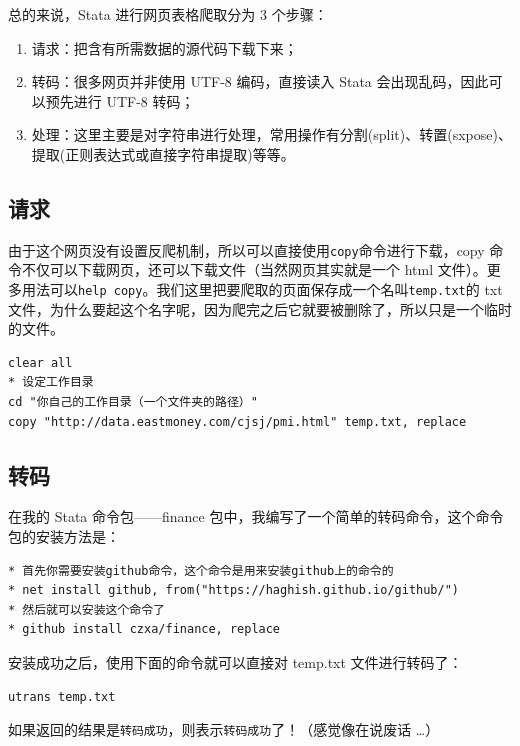 \documentclass[cn,fancy,blue,11pt]{elegantbook}
\begin{document}
总的来说，Stata 进行网页表格爬取分为 3 个步骤：
\begin{enumerate}
  \item 请求：把含有所需数据的源代码下载下来；
  \item 转码：很多网页并非使用 UTF-8 编码，直接读入 Stata 会出现乱码，因此可以预先进行 UTF-8 转码；
  \item 处理：这里主要是对字符串进行处理，常用操作有分割(split)、转置(sxpose)、提取(正则表达式或直接字符串提取)等等。
\end{enumerate}

\hypertarget{section-32}{%
\subsection{请求}\label{section-32}}

由于这个网页没有设置反爬机制，所以可以直接使用\lstinline{copy}命令进行下载，copy 命令不仅可以下载网页，还可以下载文件（当然网页其实就是一个 html 文件）。更多用法可以\lstinline{help copy}。我们这里把要爬取的页面保存成一个名叫\lstinline{temp.txt}的 txt 文件，为什么要起这个名字呢，因为爬完之后它就要被删除了，所以只是一个临时的文件。

\begin{lstlisting}
clear all
* 设定工作目录
cd "你自己的工作目录（一个文件夹的路径）"
copy "http://data.eastmoney.com/cjsj/pmi.html" temp.txt, replace
\end{lstlisting}

\hypertarget{section-33}{%
\subsection{转码}\label{section-33}}

在我的 Stata 命令包------finance 包中，我编写了一个简单的转码命令，这个命令包的安装方法是：

\begin{lstlisting}
* 首先你需要安装github命令，这个命令是用来安装github上的命令的
* net install github, from("https://haghish.github.io/github/")
* 然后就可以安装这个命令了
* github install czxa/finance, replace
\end{lstlisting}

安装成功之后，使用下面的命令就可以直接对 temp.txt 文件进行转码了：

\begin{lstlisting}
utrans temp.txt
\end{lstlisting}

如果返回的结果是\lstinline{转码成功}，则表示\lstinline{转码成功}了！（感觉像在说废话 \dots）
\end{document}
